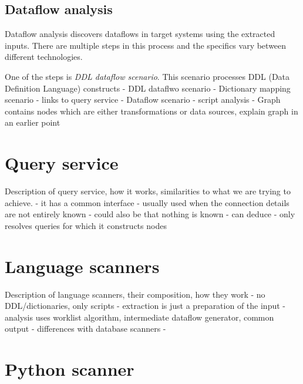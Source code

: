 \subsection{Dataflow analysis}

Dataflow analysis discovers dataflows in target systems using the extracted inputs. There are multiple steps in this process and the specifics vary between different technologies.
\par
One of the steps is \textit{DDL dataflow scenario}. This scenario processes DDL (Data Definition Language) constructs 
- DDL dataflwo scenario
- Dictionary mapping scenario - links to query service
- Dataflow scenario - script analysis
- Graph contains nodes which are either transformations or data sources, explain graph in an earlier point

\section{Query service}
Description of query service, how it works, similarities to what we are trying to achieve.
- it has a common interface
- usually used when the connection details are not entirely known
- could also be that nothing is known
- can deduce
- only resolves queries for which it constructs nodes

\section{Language scanners}
Description of language scanners, their composition, how they work
- no DDL/dictionaries, only scripts
- extraction is just a preparation of the input
- analysis uses worklist algorithm, intermediate dataflow generator, common output
- differences with database scanners
- 

\section{Python scanner}